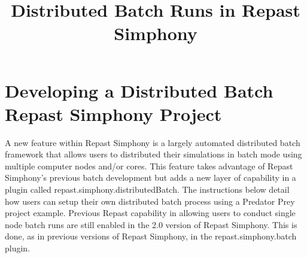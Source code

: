 \documentclass[12pt]{article}
\title{Distributed Batch Runs in Repast Simphony}
\begin{document}
\begin{titlepage}
\maketitle
\vfill

\thispagestyle{empty}
\end{titlepage}

\pagebreak

\section{Developing a Distributed Batch Repast Simphony Project}

A new feature within Repast Simphony is a largely automated distributed batch framework that allows users to distributed their
simulations in batch mode using multiple computer nodes and/or cores. This feature takes advantage of Repast Simphony's previous
batch development but adds a new layer of capability in a plugin called repast.simphony.distributedBatch. The instructions below detail
how users can setup their own distributed batch process using a Predator Prey project example. Previous Repast capability in allowing
users to conduct single node batch runs are still enabled
in the 2.0 version of Repast Simphony. This is done, as in previous
versions of Repast Simphony, in
the repast.simphony.batch plugin.
\end{document}
